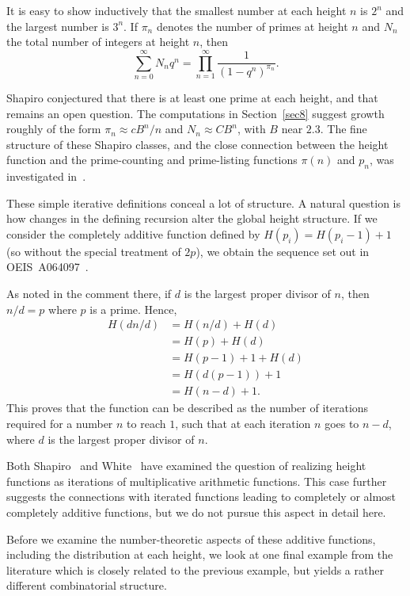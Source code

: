 \documentclass[11pt]{article}
\theoremstyle{definition}
\begin{document}
It is easy to show inductively that the smallest number at each height $n$ is
$2^n$ and the largest number is $3^n$.  If $\pi_n$ denotes the number of primes
at height $n$ and $N_n$ the total number of integers at height $n$, then
\[
  \sum_{n=0}^{\infty}N_nq^n
  =
  \prod_{n=1}^{\infty}\frac{1}{(1-q^n)^{\pi_n}}.
\]

Shapiro conjectured that there is at least one prime at each height, and that
remains an open question.  The computations in Section~\ref{sec8} suggest
growth roughly of the form $\pi_n\approx cB^n/n$ and $N_n\approx C B^n$, with
$B$ near $2.3$.  The fine structure of these Shapiro classes, and the close
connection between the height function and the prime-counting and prime-listing
functions $\pi(n)$ and $p_n$, was investigated in~\cite{balbhatnagar}.

These simple iterative definitions conceal a lot of structure. A natural question is how changes in the defining recursion alter the global height structure. If we consider the completely additive function defined by $H(p_i) = H(p_i - 1) +1$ (so without the special treatment of $2p$), we obtain the sequence set out in OEIS~A064097~\cite{OEIS}.

As noted in the comment there, if $d$ is the largest proper divisor of $n$, then $n/d = p$ where $p$ is a prime. Hence,
\[
\begin{aligned}
  H(dn/d)
  &=H(n/d)+H(d)\\
  &=H(p)+H(d)\\
  &=H(p-1)+1+H(d)\\
  &=H(d(p-1))+1\\
  &=H(n-d)+1.
\end{aligned}
\]
This proves that the function can be described as the number of iterations required for a number $n$ to reach $1$, such that at each iteration $n$ goes to $n-d$, where $d$ is the largest proper divisor of $n$.\par

Both Shapiro~\cite{shapiro2} and White~\cite{white} have examined the question of realizing height functions as iterations of multiplicative arithmetic functions. This case further suggests the connections with iterated functions leading to completely or almost completely additive functions, but we do not pursue this aspect in detail here.\par

Before we examine the number-theoretic aspects of these additive functions, including the distribution at each height, we look at one final example from the literature which is closely related to the previous example, but yields a rather different combinatorial structure.\par
\end{document}
